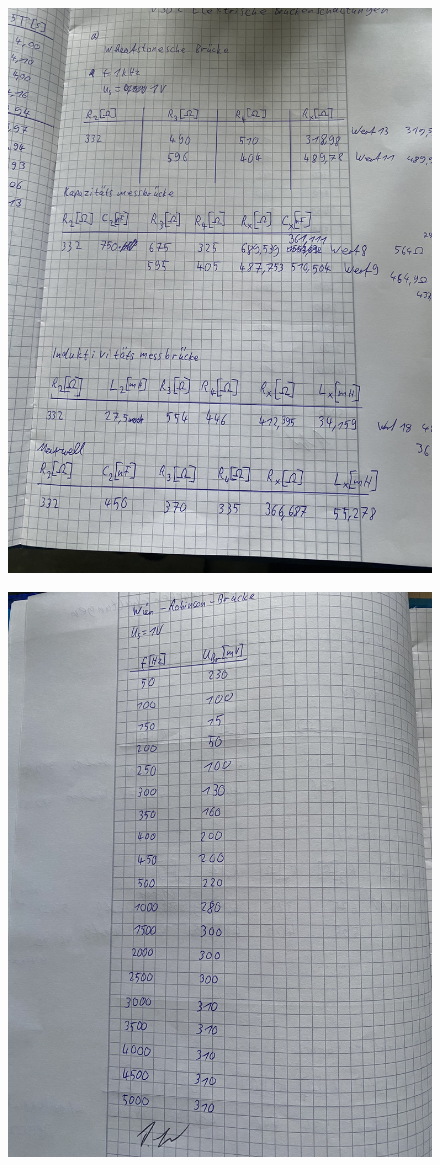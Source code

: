   \begin{figure}
    \centering
    \includegraphics[scale=0.1, angle=270]{Bilder/mess1.jpg}
    
    \label{fig:mess1}
  \end{figure}
  \begin{figure}
    \centering
    \includegraphics[scale=0.1, angle=270]{Bilder/mess2.jpg}
  
    \label{fig:mess2}
  \end{figure}